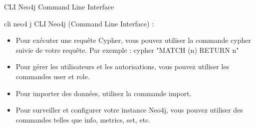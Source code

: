 \begin{frame}{	CLI Neo4j Command Line Interface}
  \begin{block}{cli neo4 j}
    	CLI Neo4j (Command Line Interface) :
\begin{itemize}
   
	\item Pour exécuter une requête Cypher, vous pouvez utiliser la commande cypher suivie de votre requête. Par exemple : cypher "MATCH (n) RETURN n"
\item	Pour gérer les utilisateurs et les autorisations, vous pouvez utiliser les commandes user et role.
\item	Pour importer des données, utilisez la commande import.
\item	Pour surveiller et configurer votre instance Neo4j, vous pouvez utiliser des commandes telles que info, metrics, set, etc.
\end{itemize}
  \end{block}
  
\end{frame}